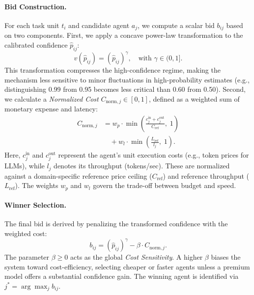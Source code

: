 \documentclass[11pt]{article}
\begin{document}
\paragraph{Bid Construction.}
For each task unit $t_i$ and candidate agent $a_j$, we compute a scalar bid $b_{ij}$ based on two components.
First, we apply a concave power-law transformation to the calibrated confidence $\hat{p}_{ij}$:
\begin{equation}
v(\hat{p}_{ij}) = (\hat{p}_{ij})^\gamma, \quad \text{with } \gamma \in (0, 1].
\end{equation}
This transformation compresses the high-confidence regime, making the mechanism less sensitive to minor fluctuations in high-probability estimates (e.g., distinguishing 0.99 from 0.95 becomes less critical than 0.60 from 0.50).
Second, we calculate a \textit{Normalized Cost} $C_{\text{norm}, j} \in [0, 1]$, defined as a weighted sum of monetary expense and latency:
\begin{equation}
\begin{aligned}
C_{\text{norm}, j}
&= w_p \cdot \min\!\left(
    \frac{c^{\text{in}}_j + c^{\text{out}}_j}{C_{\text{ref}}},\; 1
\right) \\
&\quad + w_l \cdot \min\!\left(
    \frac{L_{\text{ref}}}{l_j},\; 1
\right).
\end{aligned}
\label{eq:cost_norm}
\end{equation}
Here, $c^{\text{in}}_j$ and $c^{\text{out}}_j$ represent the agent's unit execution costs (e.g., token prices for LLMs), while $l_j$ denotes its throughput (tokens/sec). These are normalized against a domain-specific reference price ceiling ($C_{\text{ref}}$) and reference throughput ($L_{\text{ref}}$). The weights $w_p$ and $w_l$ govern the trade-off between budget and speed.
\paragraph{Winner Selection.}
The final bid is derived by penalizing the transformed confidence with the weighted cost:
\begin{equation}
b_{ij} = (\hat{p}_{ij})^{\gamma} - \beta \cdot C_{\text{norm}, j}.
\end{equation}
The parameter $\beta \geq 0$ acts as the global \textit{Cost Sensitivity}. A higher $\beta$ biases the system toward cost-efficiency, selecting cheaper or faster agents unless a premium model offers a substantial confidence gain. The winning agent is identified via $j^* = \arg\max_{j} b_{ij}$.
\end{document}
